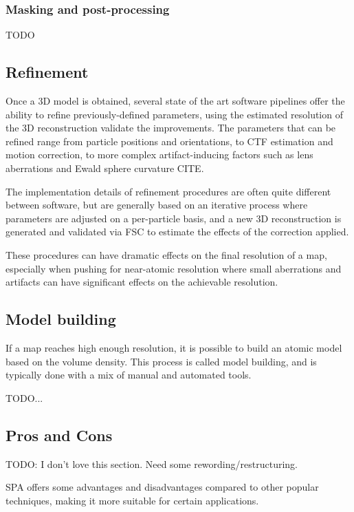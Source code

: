 \subsubsection{Masking and post-processing}
TODO

\subsection{Refinement}\label{em_refinement}

Once a 3D model is obtained, several state of the art software pipelines offer the ability to refine previously-defined parameters, using the estimated resolution of the 3D reconstruction validate the improvements.
The parameters that can be refined range from particle positions and orientations, to CTF estimation and motion correction, to more complex artifact-inducing factors such as lens aberrations and Ewald sphere curvature CITE.

The implementation details of refinement procedures are often quite different between software, but are generally based on an iterative process where parameters are adjusted on a per-particle basis, and a new 3D reconstruction is generated and validated via FSC to estimate the effects of the correction applied.

These procedures can have dramatic effects on the final resolution of a map, especially when pushing for near-atomic resolution where small aberrations and artifacts can have significant effects on the achievable resolution.

\subsection{Model building}

If a map reaches high enough resolution, it is possible to build an atomic model based on the volume density.
This process is called model building, and is typically done with a mix of manual and automated tools.

TODO...

\subsection{Pros and Cons}

TODO: I don't love this section. Need some rewording/restructuring.

SPA offers some advantages and disadvantages compared to other popular techniques, making it more suitable for certain applications.

